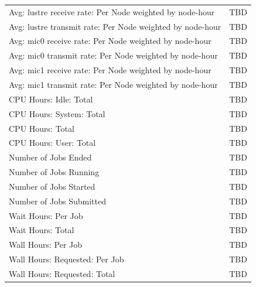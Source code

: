 \documentclass{sig-alternate-05-2015}
\begin{document}
\begin{table}[htb]
\begin{scriptsize}
\begin{tabular}{l|l}
Avg: lustre receive rate: Per Node weighted by node-hour &  TBD \\
Avg: lustre transmit rate: Per Node weighted by node-hour &  TBD \\
Avg: mic0 receive rate: Per Node weighted by node-hour &  TBD \\
Avg: mic0 transmit rate: Per Node weighted by node-hour &  TBD \\
Avg: mic1 receive rate: Per Node weighted by node-hour &  TBD \\
Avg: mic1 transmit rate: Per Node weighted by node-hour &  TBD \\
CPU Hours: Idle: Total &  TBD \\
CPU Hours: System: Total &  TBD \\
CPU Hours: Total &  TBD \\
CPU Hours: User: Total &  TBD \\
Number of Jobs Ended &  TBD \\
Number of Jobs Running &  TBD \\
Number of Jobs Started &  TBD \\
Number of Jobs Submitted &  TBD \\
Wait Hours: Per Job &  TBD \\
Wait Hours: Total &  TBD \\
Wall Hours: Per Job &  TBD \\
Wall Hours: Requested: Per Job &  TBD \\
Wall Hours: Requested: Total &  TBD \\
\hline 
\end{tabular}\\
\end{scriptsize}
\end{table}
\end{document}
